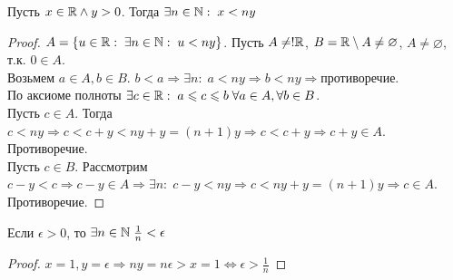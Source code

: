 \begin{theorem}
    Пусть $x \in \mathbb{R} \land y > 0$. Тогда  $\exists n \in \mathbb{N}:\; x < ny$
\end{theorem}
\begin{proof}
    $A = \{u \in \mathbb{R}:\; \exists n \in \mathbb{N}:\; u < ny\}$. Пусть $A \neq! \mathbb{R}$, $B = \mathbb{R} \setminus A \neq \varnothing$,  $A \neq \varnothing$, т.к.  $0 \in A$.\\
    Возьмем  $a \in A, b \in B$.  $b < a \Rightarrow \exists n: \; a < ny \Rightarrow b < ny \Rightarrow \texttt{противоречие}$. \\
    По аксиоме полноты $\exists c \in \mathbb{R}: \; a \leqslant c \leqslant b \; \forall a \in A, \forall b \in B$.  \\
    Пусть $c \in A$. Тогда  $c < ny \Rightarrow c < c + y < ny + y = (n+1)y \Rightarrow c < c + y \Rightarrow c + y \in A$. Противоречие. \\
    Пусть  $c \in B$.  Рассмотрим $c-y<c \Rightarrow c-y \in A \Rightarrow \exists n: \; c - y < ny \Rightarrow c < ny + y = (n+1)y \Rightarrow c \in A$. Противоречие.
\end{proof}

\begin{consequence}
    Если $\epsilon > 0$, то $\exists n \in \mathbb{N} \; \frac{1}{n} < \epsilon$
\end{consequence}
\begin{proof}
    $x = 1, y = \epsilon \Rightarrow ny = n \epsilon > x = 1 \iff \epsilon > \frac{1}{n}$
\end{proof}
